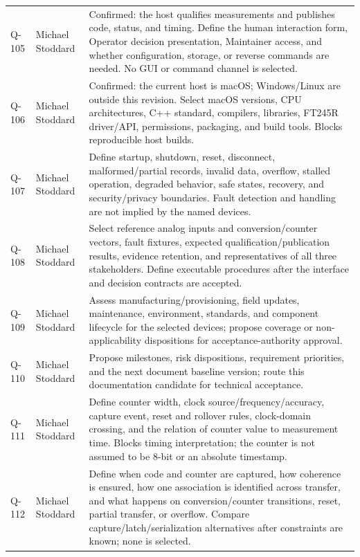 \begin{tabularx}{\linewidth}{L{1.3cm}L{3.1cm}Y}
\label{Question:Q-105}Q-105 & Michael Stoddard & Confirmed: the host qualifies measurements and publishes code, status, and timing. Define the human interaction form, Operator decision presentation, Maintainer access, and whether configuration, storage, or reverse commands are needed. No GUI or command channel is selected.\\
\label{Question:Q-106}Q-106 & Michael Stoddard & Confirmed: the current host is macOS; Windows/Linux are outside this revision. Select macOS versions, CPU architectures, C++ standard, compilers, libraries, FT245R driver/API, permissions, packaging, and build tools. Blocks reproducible host builds.\\
\label{Question:Q-107}Q-107 & Michael Stoddard & Define startup, shutdown, reset, disconnect, malformed/partial records, invalid data, overflow, stalled operation, degraded behavior, safe states, recovery, and security/privacy boundaries. Fault detection and handling are not implied by the named devices.\\
\label{Question:Q-108}Q-108 & Michael Stoddard & Select reference analog inputs and conversion/counter vectors, fault fixtures, expected qualification/publication results, evidence retention, and representatives of all three stakeholders. Define executable procedures after the interface and decision contracts are accepted.\\
\label{Question:Q-109}Q-109 & Michael Stoddard & Assess manufacturing/provisioning, field updates, maintenance, environment, standards, and component lifecycle for the selected devices; propose coverage or non-applicability dispositions for acceptance-authority approval.\\
\label{Question:Q-110}Q-110 & Michael Stoddard & Propose milestones, risk dispositions, requirement priorities, and the next document baseline version; route this documentation candidate for technical acceptance.\\
\label{Question:Q-111}Q-111 & Michael Stoddard & Define counter width, clock source/frequency/accuracy, capture event, reset and rollover rules, clock-domain crossing, and the relation of counter value to measurement time. Blocks timing interpretation; the counter is not assumed to be 8-bit or an absolute timestamp.\\
\label{Question:Q-112}Q-112 & Michael Stoddard & Define when code and counter are captured, how coherence is ensured, how one association is identified across transfer, and what happens on conversion/counter transitions, reset, partial transfer, or overflow. Compare capture/latch/serialization alternatives after constraints are known; none is selected.\\

\end{tabularx}
